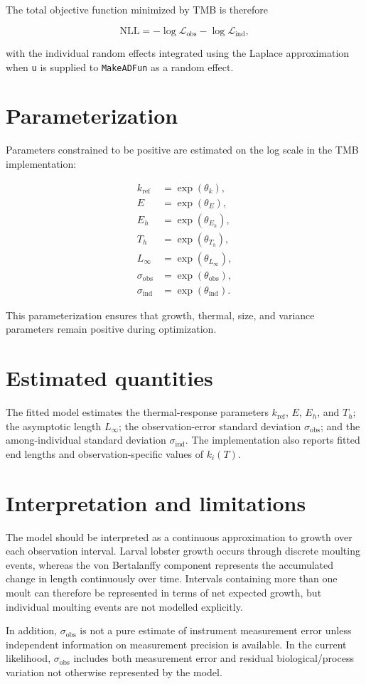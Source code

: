 \documentclass[11pt]{article}
\begin{document}
The total objective function minimized by TMB is therefore

\begin{equation}
\mathrm{NLL}
=
-\log \mathcal{L}_{\mathrm{obs}}
-\log \mathcal{L}_{\mathrm{ind}},
\end{equation}

with the individual random effects integrated using the Laplace approximation when \texttt{u} is supplied to \texttt{MakeADFun} as a random effect.

\section{Parameterization}

Parameters constrained to be positive are estimated on the log scale in the TMB implementation:

\begin{align*}
k_{\mathrm{ref}} &= \exp(\theta_k),\\
E &= \exp(\theta_E),\\
E_h &= \exp(\theta_{E_h}),\\
T_h &= \exp(\theta_{T_h}),\\
L_{\infty} &= \exp(\theta_{L_{\infty}}),\\
\sigma_{\mathrm{obs}} &= \exp(\theta_{\mathrm{obs}}),\\
\sigma_{\mathrm{ind}} &= \exp(\theta_{\mathrm{ind}}).
\end{align*}

This parameterization ensures that growth, thermal, size, and variance parameters remain positive during optimization.

\section{Estimated quantities}

The fitted model estimates the thermal-response parameters $k_{\mathrm{ref}}$, $E$, $E_h$, and $T_h$; the asymptotic length $L_{\infty}$; the observation-error standard deviation $\sigma_{\mathrm{obs}}$; and the among-individual standard deviation $\sigma_{\mathrm{ind}}$. The implementation also reports fitted end lengths and observation-specific values of $k_i(T)$.

\section{Interpretation and limitations}

The model should be interpreted as a continuous approximation to growth over each observation interval. Larval lobster growth occurs through discrete moulting events, whereas the von Bertalanffy component represents the accumulated change in length continuously over time. Intervals containing more than one moult can therefore be represented in terms of net expected growth, but individual moulting events are not modelled explicitly.

In addition, $\sigma_{\mathrm{obs}}$ is not a pure estimate of instrument measurement error unless independent information on measurement precision is available. In the current likelihood, $\sigma_{\mathrm{obs}}$ includes both measurement error and residual biological/process variation not otherwise represented by the model.
\end{document}
